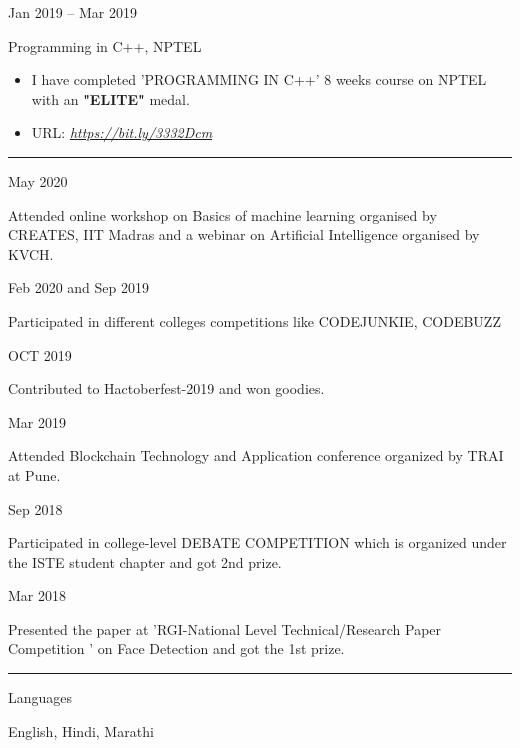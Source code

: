 \documentclass[a4paper,10pt]{article}
\newlength{\cvcolumngapwidth}
\newlength{\cvleftcolumnwidth}
\newlength{\cvrightcolumnwidth}
\newcommand{\cvsectionstyle}[1]{{\normalsize\cvsectionfont\textcolor{cvsectioncolor}{#1}}}
\newcommand{\cvtitlestyle}[1]{{\large\cvtitlefont\textcolor{cvtitlecolor}{#1}}}
\newcommand{\cvdurationstyle}[1]{{\small\cvdurationfont\textcolor{cvdurationcolor}{#1}}}
\newcommand{\cvheadingstyle}[1]{{\normalsize\cvheadingfont\textcolor{cvheadingcolor}{#1}}}
\newlength{\cvafteritemskipamount}
\newlength{\cvaftersectionskipamount}
\newlength{\cvbetweensectionandheadingextraskipamount}
\newlength{\cvaftertitleskipamount}
\newlength{\cvparskip}
\newcommand{\cvsection}[1]{
    \begin{minipage}[t]{\cvleftcolumnwidth}
        \raggedleft\cvsectionstyle{#1}
    \end{minipage}%
    \hspace{\cvcolumngapwidth}%
    \begin{minipage}[t]{\cvrightcolumnwidth}
        \textcolor{cvrulecolor}{\rule{\cvrightcolumnwidth}{0.3mm}}
    \end{minipage}

    \vspace{\cvaftersectionskipamount}
}
\newcommand{\cvitem}[2]{
    \begin{minipage}[t]{\cvleftcolumnwidth}
        \raggedleft #1
    \end{minipage}%
    \hspace{\cvcolumngapwidth}%
    \begin{minipage}[t]{\cvrightcolumnwidth}
        \setlength{\parskip}{\cvparskip} #2
    \end{minipage}

    \vspace{\cvafteritemskipamount}
}
\newcommand{\cvtitle}[1]{
    \cvtitlestyle{#1}

    \vspace{\cvaftertitleskipamount}
    \vspace{-\cvparskip}
}
\begin{document}
\cvitem{
    \cvdurationstyle{Jan 2019 -- Mar 2019}
}{
    \cvtitle{Programming in C++, NPTEL}


    \begin{itemize}[leftmargin=*]
         \item I have completed 'PROGRAMMING IN C++' 8 weeks
course on NPTEL with an \textbf{"ELITE"} medal.
        \item URL:
        \textit{\href{https://nptel.ac.in/noc/Ecertificate/?q=noc19-cs10/NPTEL19CS10S21740556191063293.jpg}{https://bit.ly/3332Dcm}}
        
    \end{itemize}
}









\cvsection{EXTRA CURRICULUM ACTIVITIES}

\vspace{\cvbetweensectionandheadingextraskipamount}

\cvitem{
    \cvheadingstyle{May 2020}
}{
    Attended online workshop on Basics of machine learning organised by CREATES, IIT Madras and a webinar on Artificial Intelligence organised by KVCH.
}



\cvitem{
    \cvheadingstyle{Feb 2020 and Sep 2019}
}{
   Participated in different colleges competitions like CODEJUNKIE, CODEBUZZ
}

\cvitem{
    \cvheadingstyle{OCT 2019}
}{
  Contributed to Hactoberfest-2019 and won goodies.
}


\cvitem{
    \cvheadingstyle{Mar 2019}
}{
  Attended Blockchain Technology and Application conference organized by TRAI at Pune.
}

\cvitem{
    \cvheadingstyle{Sep 2018}
}{
    Participated in college-level DEBATE COMPETITION which is organized under the ISTE student chapter and got 2nd prize.
}

\cvitem{
    \cvheadingstyle{Mar 2018}
}{
    Presented the paper at ’RGI-National Level Technical/Research Paper Competition ’ on Face Detection and got the 1st prize.
}

\cvsection{PERSONAL DETAILS}

\cvitem{
    \cvheadingstyle{Languages}
}{
    \item English, Hindi, Marathi
}
\end{document}

